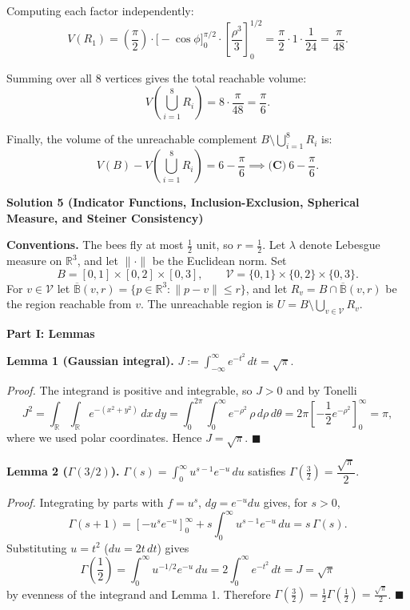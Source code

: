 \begin{enumerate}
 Computing each factor independently:
 \[V(R_1) = \left(\frac{\pi}{2}\right) \cdot \Big[-\cos\phi\Big]_0^{\pi/2} \cdot \left[\frac{\rho^3}{3}\right]_0^{1/2} = \frac{\pi}{2} \cdot 1 \cdot \frac{1}{24} = \frac{\pi}{48}.\]

 Summing over all $8$ vertices gives the total reachable volume:
 \[V\left(\bigcup_{i=1}^8 R_i\right) = 8 \cdot \frac{\pi}{48} = \frac{\pi}{6}.\]

 Finally, the volume of the unreachable complement $B \setminus \bigcup_{i=1}^8 R_i$ is:
 \[V(B) - V\left(\bigcup_{i=1}^8 R_i\right) = 6 - \frac{\pi}{6} \implies \boxed{\textbf{(C)}\ 6 - \frac{\pi}{6}}.\]




\textbf{Solution 5 (Indicator Functions, Inclusion-Exclusion, Spherical Measure, and Steiner Consistency)}

\textbf{Conventions.} The bees fly at most $\frac12$ unit, so $r=\frac12$. Let $\lambda$ denote Lebesgue measure on $\mathbb{R}^3$, and let $\|\cdot\|$ be the Euclidean norm. Set
 \[B=[0,1]\times[0,2]\times[0,3],\qquad \mathcal{V}=\{0,1\}\times\{0,2\}\times\{0,3\}.\]For $v\in\mathcal{V}$ let $\overline{\mathbb{B}}(v,r)=\{p\in\mathbb{R}^3:\|p-v\|\le r\}$, and let $R_v=B\cap\overline{\mathbb{B}}(v,r)$ be the region reachable from $v$. The unreachable region is $U=B\setminus\bigcup_{v\in\mathcal{V}}R_v$.

 \textbf{Part I: Lemmas}

 \textbf{Lemma 1 (Gaussian integral).} $J:=\int_{-\infty}^{\infty}e^{-t^2}\,dt=\sqrt{\pi}$.

 \textit{Proof.} The integrand is positive and integrable, so $J>0$ and by Tonelli
 \[J^2=\int_{\mathbb{R}}\int_{\mathbb{R}}e^{-(x^2+y^2)}\,dx\,dy=\int_0^{2\pi}\int_0^{\infty}e^{-\rho^2}\,\rho\,d\rho\,d\theta=2\pi\left[-\frac12e^{-\rho^2}\right]_0^{\infty}=\pi,\]where we used polar coordinates. Hence $J=\sqrt{\pi}$. $\blacksquare$

 \textbf{Lemma 2 ($\Gamma(3/2)$).} $\Gamma(s)=\int_0^\infty u^{s-1}e^{-u}\,du$ satisfies $\Gamma\left(\frac32\right)=\dfrac{\sqrt{\pi}}{2}$.

 \textit{Proof.} Integrating by parts with $f=u^{s}$, $dg=e^{-u}du$ gives, for $s>0$,
 \[\Gamma(s+1)=\left[-u^{s}e^{-u}\right]_0^\infty+s\int_0^\infty u^{s-1}e^{-u}\,du=s\,\Gamma(s).\]Substituting $u=t^2$ ($du=2t\,dt$) gives
 \[\Gamma\left(\frac12\right)=\int_0^\infty u^{-1/2}e^{-u}\,du=2\int_0^\infty e^{-t^2}\,dt=J=\sqrt{\pi}\]by evenness of the integrand and Lemma 1. Therefore $\Gamma\left(\frac32\right)=\frac12\Gamma\left(\frac12\right)=\frac{\sqrt{\pi}}{2}$. $\blacksquare$


\end{enumerate}
